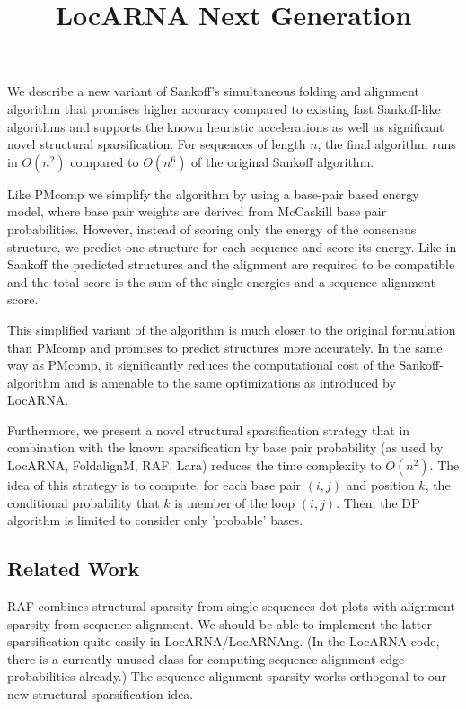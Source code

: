\documentclass{article}
\title{LocARNA Next Generation}
\begin{document}
\maketitle

We describe a new variant of Sankoff's simultaneous folding and
alignment algorithm that promises higher accuracy compared to existing
fast Sankoff-like algorithms and supports the known heuristic
accelerations as well as significant novel structural
sparsification. For sequences of length $n$, the final algorithm runs
in $O(n^2)$ compared to $O(n^6)$ of the original Sankoff algorithm.

Like PMcomp we simplify the algorithm by using a base-pair based
energy model, where base pair weights are derived from McCaskill base
pair probabilities. However, instead of scoring only the energy of the
consensus structure, we predict one structure for each sequence and
score its energy. Like in Sankoff the predicted structures and the
alignment are required to be compatible and the total score is the sum
of the single energies and a sequence alignment score.
  
This simplified variant of the algorithm is much closer to the
original formulation than PMcomp and promises to predict structures
more accurately. In the same way as PMcomp, it significantly reduces
the computational cost of the Sankoff-algorithm and is amenable to the
same optimizations as introduced by LocARNA.

Furthermore, we present a novel structural sparsification strategy
that in combination with the known sparsification by base pair
probability (as used by LocARNA, FoldalignM, RAF, Lara) reduces the
time complexity to $O(n^2)$. The idea of this strategy is to compute,
for each base pair $(i,j)$ and position $k$, the conditional
probability that $k$ is member of the loop $(i,j)$. Then, the DP
algorithm is limited to consider only 'probable' bases.

\subsection*{Related Work}

 RAF combines structural sparsity from
single sequences dot-plots with alignment sparsity from sequence
alignment. We should be able to implement the latter sparsification
quite easily in LocARNA/LocARNAng.  (In the LocARNA code, there is a
currently unused class for computing sequence alignment edge
probabilities already.) The sequence alignment sparsity works
orthogonal to our new structural sparsification idea.
\end{document}
